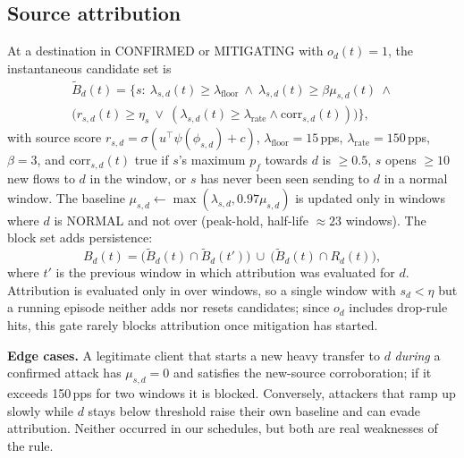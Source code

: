 \documentclass[conference]{IEEEtran}
\begin{document}
\subsection{Source attribution}\label{sec:attr}
At a destination in CONFIRMED or MITIGATING with $o_d(t)=1$, the instantaneous candidate set is
\begin{multline}
\tilde B_d(t)=\big\{s:\ \lambda_{s,d}(t)\ge\lambda_{\text{floor}}\ \wedge\ \lambda_{s,d}(t)\ge\beta\mu_{s,d}(t)\ \wedge\\
\big(r_{s,d}(t)\ge\eta_s\ \lor\ (\lambda_{s,d}(t)\ge\lambda_{\text{rate}}\wedge \mathrm{corr}_{s,d}(t))\big)\big\},
\end{multline}
with source score $r_{s,d}=\sigma(u^\top\psi(\phi_{s,d})+c)$, $\lambda_{\text{floor}}=15$\,pps, $\lambda_{\text{rate}}=150$\,pps, $\beta=3$, and $\mathrm{corr}_{s,d}(t)$ true if $s$'s maximum $p_f$ towards $d$ is $\ge0.5$, $s$ opens $\ge10$ new flows to $d$ in the window, or $s$ has never been seen sending to $d$ in a normal window. The baseline $\mu_{s,d}\leftarrow\max(\lambda_{s,d},0.97\mu_{s,d})$ is updated only in windows where $d$ is NORMAL and not over (peak-hold, half-life $\approx23$ windows). The block set adds persistence:
\begin{equation}
B_d(t)=\big(\tilde B_d(t)\cap\tilde B_d(t')\big)\ \cup\ \big(\tilde B_d(t)\cap R_d(t)\big),
\end{equation}
where $t'$ is the previous window in which attribution was evaluated for $d$. Attribution is evaluated only in over windows, so a single window with $s_d<\eta$ but a running episode neither adds nor resets candidates; since $o_d$ includes drop-rule hits, this gate rarely blocks attribution once mitigation has started.

\textbf{Edge cases.} A legitimate client that starts a new heavy transfer to $d$ \emph{during} a confirmed attack has $\mu_{s,d}=0$ and satisfies the new-source corroboration; if it exceeds 150\,pps for two windows it is blocked. Conversely, attackers that ramp up slowly while $d$ stays below threshold raise their own baseline and can evade attribution. Neither occurred in our schedules, but both are real weaknesses of the rule.
\end{document}
